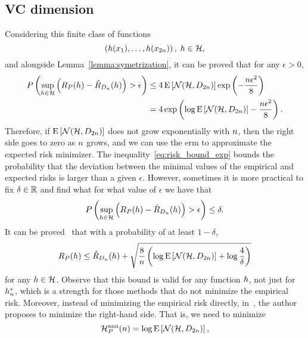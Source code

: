 \subsection{VC dimension}
%
Considering this finite class of functions
$$ \left(h(x_1), \ldots, h(x_{2 n})  \right), \; h \in \mathcal{H} ,$$
and alongside Lemma~\ref{lemma:symetrization}, it can be proved that for any $\epsilon > 0$,
\begin{equation}
    \label{eq:risk_bound_exp}
    \begin{aligned}
        P \left(\sup_{\hypf \in \hypspace} \left(\exprisk(\hypf) - \empriskn(\hypf) \right) > \epsilon \right) &\leq 4 \expect\left[\mathcal{N}(\hypspace, \sample_{2 \nsamples}) \right] \exp\left(- \frac{\nsamples \epsilon^2}{8} \right) \\
        &= 4 \exp\left(\log \expect\left[\mathcal{N}(\hypspace, \sample_{2 \nsamples}) \right] - \frac{\nsamples \epsilon^2}{8} \right) .
    \end{aligned}
\end{equation}
Therefore, if $\operatorname{E}\left[\mathcal{N}(\mathcal{H}, D_{2 n}) \right]$ does not grow exponentially with $n$, then the right side goes to zero as $n$ grows, and we can use the \acrshort{erm} to approximate the expected risk minimizer. 
%
%
The inequality~\eqref{eq:risk_bound_exp} bounds the probability that the deviation between the minimal values of the empirical and expected risks is larger than a given $\epsilon$. However, sometimes it is more practical to fix $\delta \in \mathbb{R}$ and find what for what value of $\epsilon$ we have that 
$$ P \left(\sup_{h \in \mathcal{H}} \left(R_P(h) - \hat{R}_{D_{n}}(h) \right) > \epsilon \right) \leq \delta .$$
It can be proved~\citep{vapnik1982estimation} that with a probability of at least $1 - \delta$, 
\begin{equation}
    \label{eq:risk_bound_ent}
    \exprisk(\hypf) \leq \empriskn(\hypf) + \sqrt{\frac{8}{\nsamples} \left(\log \expect\left[\mathcal{N}(\hypspace, \sample_{2 \nsamples})\right] + \log \frac{4}{\delta} \right)}
\end{equation}
for any $h \in \mathcal{H}$. Observe that this bound is valid for any function $h$, not just for ${h}^*_n$, which is a strength for those methods that do not minimize the empirical risk.
%
Moreover, instead of minimizing the empirical risk directly, in~\citet{Vapnik00}, the author proposes to minimize the right-hand side. That is, we need to minimize 
\begin{equation}
    \nonumber
    \mathcal{H}^{\text{ann}}_{P}(n) = \log \operatorname{E}\left[\mathcal{N}(\mathcal{H}, D_{2 n}) \right] ,
\end{equation}
